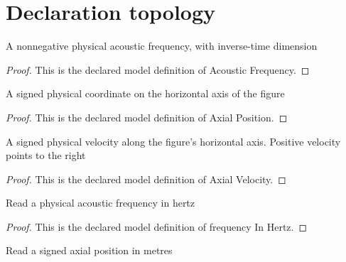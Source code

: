 \section{Declaration topology}
\begin{definition}
  \label{def:physics:phyx-mini-0222:phyxminiproblems-problemphyxmini0222-acousticfrequency}
  A nonnegative physical acoustic frequency, with inverse-time dimension
\end{definition}
\begin{proof}
  This is the declared model definition of Acoustic Frequency.
\end{proof}
\begin{definition}
  \label{def:physics:phyx-mini-0222:phyxminiproblems-problemphyxmini0222-axialposition}
  A signed physical coordinate on the horizontal axis of the figure
\end{definition}
\begin{proof}
  This is the declared model definition of Axial Position.
\end{proof}
\begin{definition}
  \label{def:physics:phyx-mini-0222:phyxminiproblems-problemphyxmini0222-axialvelocity}
  A signed physical velocity along the figure's horizontal axis. Positive velocity points to the right
\end{definition}
\begin{proof}
  This is the declared model definition of Axial Velocity.
\end{proof}
\begin{definition}
  \label{def:physics:phyx-mini-0222:phyxminiproblems-problemphyxmini0222-frequencyinhertz}
  Read a physical acoustic frequency in hertz
\end{definition}
\begin{proof}
  This is the declared model definition of frequency In Hertz.
\end{proof}
\begin{definition}
  \label{def:physics:phyx-mini-0222:phyxminiproblems-problemphyxmini0222-positioninmeters}
  Read a signed axial position in metres
\end{definition}
